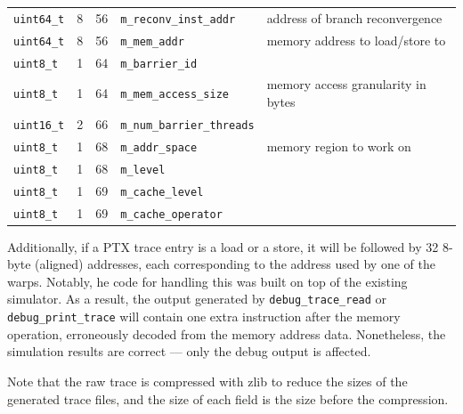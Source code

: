 \begin{footnotesize}
\begin{tabular}{l c c l l}
\Verb+uint64_t+  & 8            & 56            & \Verb+m_reconv_inst_addr+     & address of branch reconvergence                   \\
\Verb+uint64_t+  & 8            & 56            & \Verb+m_mem_addr+             & memory address to load/store to                   \\
\Verb+uint8_t+   & 1            & 64            & \Verb+m_barrier_id+           &                                                   \\
\Verb+uint8_t+   & 1            & 64            & \Verb+m_mem_access_size+      & memory access granularity in bytes                \\
\Verb+uint16_t+  & 2            & 66            & \Verb+m_num_barrier_threads+  &                                                   \\
\Verb+uint8_t+   & 1            & 68            & \Verb+m_addr_space+           & memory region to work on                          \\
\Verb+uint8_t+   & 1            & 68            & \Verb+m_level+                &                                                   \\
\Verb+uint8_t+   & 1            & 69            & \Verb+m_cache_level+          &                                                   \\
\Verb+uint8_t+   & 1            & 69            & \Verb+m_cache_operator+       &                                                   \\
\end{tabular}
\end{footnotesize}
\vspace{0.2in}

Additionally, if a PTX trace entry is a load or a store, it will be followed by
32 8-byte (aligned) addresses, each corresponding to the address used by one of
the warps. Notably, he code for handling this was built on top of the existing
simulator. As a result, the output generated by \Verb+debug_trace_read+ or
\Verb+debug_print_trace+ will contain one extra instruction after the memory
operation, erroneously decoded from the memory address data. Nonetheless, the
simulation results are correct --- only the debug output is affected.


Note that the raw trace is compressed with zlib to reduce the sizes of
the generated trace files, and the size of each field is the size
before the compression.


